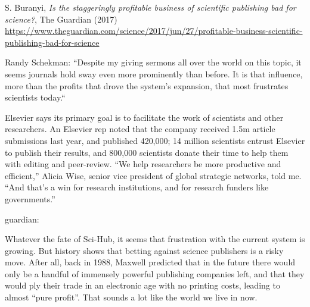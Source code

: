 \documentclass[10pt,compress,serif]{beamer}
\begin{document}
\begin{frame}[t]%
 \vskip1cm%

S. Buranyi, \textit{Is the staggeringly profitable business of scientific publishing bad for science?}, The Guardian (2017)\\
{\tiny \url{https://www.theguardian.com/science/2017/jun/27/profitable-business-scientific-publishing-bad-for-science}}



Randy Schekman: “Despite my giving sermons all over the world on this topic, it seems journals hold sway even more prominently than before. It is that influence, more than the profits that drove the system’s expansion, that most frustrates scientists today.“

 Elsevier says its primary goal is to facilitate the work of scientists and other researchers. An Elsevier rep noted that the company received 1.5m article submissions last year, and published 420,000; 14 million scientists entrust Elsevier to publish their results, and 800,000 scientists donate their time to help them with editing and peer-review. “We help researchers be more productive and efficient,” Alicia Wise, senior vice president of global strategic networks, told me. “And that’s a win for research institutions, and for research funders like governments.”


 guardian:

 Whatever the fate of Sci-Hub, it seems that frustration with the current system is growing. But history shows that betting against science publishers is a risky move. After all, back in 1988, Maxwell predicted that in the future there would only be a handful of immensely powerful publishing companies left, and that they would ply their trade in an electronic age with no printing costs, leading to almost “pure profit”. That sounds a lot like the world we live in now.
\end{frame}
\end{document}
